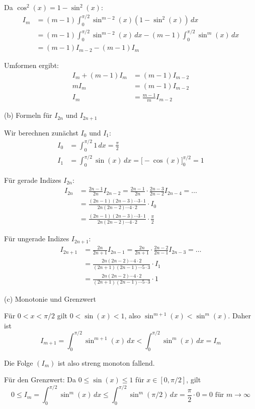 \documentclass{article}
\begin{document}
Da $\cos^2(x) = 1 - \sin^2(x)$:
\begin{align}
I_m &= (m-1)\int_0^{\pi/2} \sin^{m-2}(x)(1-\sin^2(x))\,dx \\
&= (m-1)\int_0^{\pi/2} \sin^{m-2}(x)\,dx - (m-1)\int_0^{\pi/2} \sin^m(x)\,dx \\
&= (m-1)I_{m-2} - (m-1)I_m
\end{align}

Umformen ergibt:
\begin{align}
I_m + (m-1)I_m &= (m-1)I_{m-2} \\
mI_m &= (m-1)I_{m-2} \\
I_m &= \frac{m-1}{m}I_{m-2}
\end{align}

(b) Formeln für $I_{2n}$ und $I_{2n+1}$

Wir berechnen zunächst $I_0$ und $I_1$:
\begin{align}
I_0 &= \int_0^{\pi/2} 1\,dx = \frac{\pi}{2} \\
I_1 &= \int_0^{\pi/2} \sin(x)\,dx = \Big[-\cos(x)\Big]_0^{\pi/2} = 1
\end{align}

Für gerade Indizes $I_{2n}$:
\begin{align}
I_{2n} &= \frac{2n-1}{2n}I_{2n-2} = \frac{2n-1}{2n} \cdot \frac{2n-3}{2n-2}I_{2n-4} = \ldots \\
&= \frac{(2n-1)(2n-3)\cdots 3 \cdot 1}{2n(2n-2)\cdots 4 \cdot 2} \cdot I_0 \\
&= \frac{(2n-1)(2n-3)\cdots 3 \cdot 1}{2n(2n-2)\cdots 4 \cdot 2} \cdot \frac{\pi}{2}
\end{align}

Für ungerade Indizes $I_{2n+1}$:
\begin{align}
I_{2n+1} &= \frac{2n}{2n+1}I_{2n-1} = \frac{2n}{2n+1} \cdot \frac{2n-2}{2n-1}I_{2n-3} = \ldots \\
&= \frac{2n(2n-2)\cdots 4 \cdot 2}{(2n+1)(2n-1)\cdots 5 \cdot 3} \cdot I_1 \\
&= \frac{2n(2n-2)\cdots 4 \cdot 2}{(2n+1)(2n-1)\cdots 5 \cdot 3} \cdot 1
\end{align}

(c) Monotonie und Grenzwert

Für $0 < x < \pi/2$ gilt $0 < \sin(x) < 1$, also $\sin^{m+1}(x) < \sin^m(x)$.
Daher ist
$$I_{m+1} = \int_0^{\pi/2} \sin^{m+1}(x)\,dx < \int_0^{\pi/2} \sin^m(x)\,dx = I_m$$

Die Folge $(I_m)$ ist also streng monoton fallend.

Für den Grenzwert: Da $0 \leq \sin(x) \leq 1$ für $x \in [0, \pi/2]$, gilt
$$0 \leq I_m = \int_0^{\pi/2} \sin^m(x)\,dx \leq \int_0^{\pi/2} \sin^m(\pi/2)\,dx = \frac{\pi}{2} \cdot 0 = 0 \text{ für } m \to \infty$$
\end{document}
